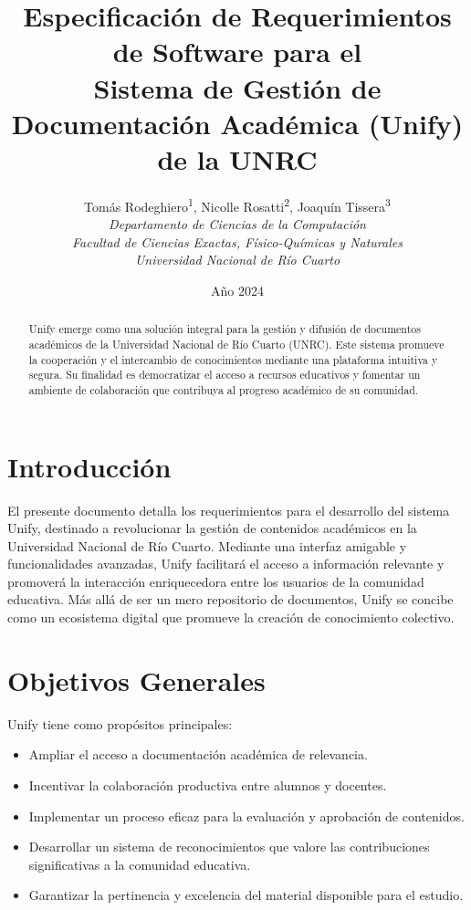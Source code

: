 \documentclass[10pt,twocolumn]{article}
\title{
  Especificación de Requerimientos de Software para el \\
  \textbf{Sistema de Gestión de Documentación Académica (Unify) de la UNRC}
}
\author{
  Tomás Rodeghiero\textsuperscript{1}, Nicolle Rosatti\textsuperscript{2}, Joaquín Tissera\textsuperscript{3} \\
  \textit{Departamento de Ciencias de la Computación} \\
  \textit{Facultad de Ciencias Exactas, Físico-Químicas y Naturales} \\\textit{Universidad Nacional de Río Cuarto}
}
\date{Año 2024}
\begin{document}
\maketitle

\begin{abstract}
Unify emerge como una solución integral para la gestión y difusión de documentos académicos de la Universidad Nacional de Río Cuarto (UNRC). Este sistema promueve la cooperación y el intercambio de conocimientos mediante una plataforma intuitiva y segura. Su finalidad es democratizar el acceso a recursos educativos y fomentar un ambiente de colaboración que contribuya al progreso académico de su comunidad.
\end{abstract}

\renewcommand{\thesection}{\Roman{section}}

\section{Introducción}
El presente documento detalla los requerimientos para el desarrollo del sistema Unify, destinado a revolucionar la gestión de contenidos académicos en la Universidad Nacional de Río Cuarto. Mediante una interfaz amigable y funcionalidades avanzadas, Unify facilitará el acceso a información relevante y promoverá la interacción enriquecedora entre los usuarios de la comunidad educativa. Más allá de ser un mero repositorio de documentos, Unify se concibe como un ecosistema digital que promueve la creación de conocimiento colectivo.

\section{Objetivos Generales}
Unify tiene como propósitos principales:
\begin{itemize}
  \item Ampliar el acceso a documentación académica de relevancia.
  \item Incentivar la colaboración productiva entre alumnos y docentes.
  \item Implementar un proceso eficaz para la evaluación y aprobación de contenidos.
  \item Desarrollar un sistema de reconocimientos que valore las contribuciones significativas a la comunidad educativa.
  \item Garantizar la pertinencia y excelencia del material disponible para el estudio.
\end{itemize}
\end{document}

